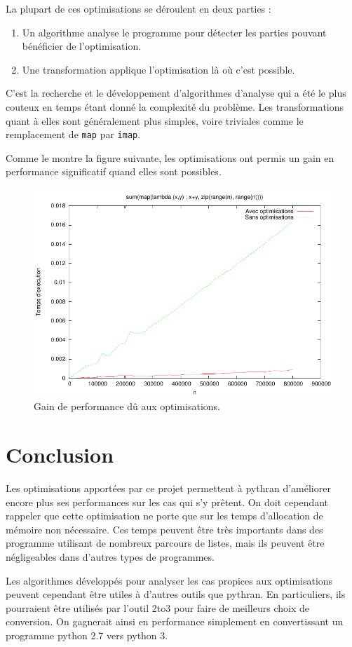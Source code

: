 \documentclass[a4paper]{article}
\begin{document}
La plupart de ces optimisations se déroulent en deux parties :

\begin{enumerate}
\item Un algorithme analyse le programme pour détecter les parties
  pouvant bénéficier de l'optimisation.
\item Une transformation applique l'optimisation là où c'est possible.
\end{enumerate}

C'est la recherche et le développement d'algorithmes d'analyse qui a
été le plus couteux en temps étant donné la complexité du
problème. Les transformations quant à elles sont généralement plus
simples, voire triviales comme le remplacement de \texttt{map} par
\texttt{imap}.

Comme le montre la figure suivante, les optimisations ont permis un
gain en performance significatif quand elles sont possibles.

\begin{figure}[h]
  \includegraphics[width=\textwidth]{perf_optimization}
  \caption{Gain de performance dû aux optimisations.}
\end{figure}


\section*{Conclusion}

Les optimisations apportées par ce projet permettent à pythran
d'améliorer encore plus ses performances sur les cas qui s'y
prêtent. On doit cependant rappeler que cette optimisation ne porte
que sur les temps d'allocation de mémoire non nécessaire. Ces temps
peuvent être très importants dans des programme utilisant de nombreux
parcours de listes, mais ils peuvent être négligeables dans d'autres
types de programmes.

Les algorithmes développés pour analyser les cas propices aux
optimisations peuvent cependant être utiles à d'autres outils que
pythran. En particuliers, ils pourraient être utilisés par l'outil
2to3 pour faire de meilleurs choix de conversion. On gagnerait ainsi
en performance simplement en convertissant un programme python 2.7
vers python 3.
\end{document}
